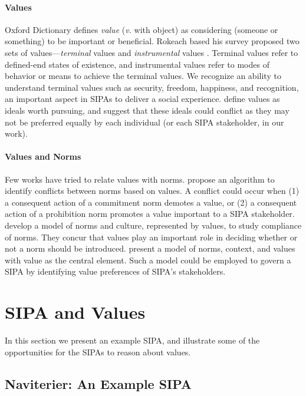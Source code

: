 \documentclass[11pt,          %
               phd,           %
               onehalfspacing %
               ]{ncsuthesis}
\newcommand{\fsl}{\textsl}
\newcommand{\navigationapp}{Naviterier\xspace}
\begin{document}
\paragraph*{Values}
Oxford Dictionary defines \fsl{value} (\emph{v.} with object) as
considering (someone or something) to be important or beneficial.
Rokeach based his survey proposed two sets of values---\fsl{terminal}
values and \fsl{instrumental} values \citep{rokeach1973nature}. Terminal
values refer to defined-end states of existence, and instrumental values
refer to modes of behavior or means to achieve the terminal values. We
recognize an ability to understand terminal values such as security,
freedom, happiness, and recognition, an important aspect in SIPAs to
deliver a social experience. \cite{Dechesne-AIL13-Norms+Values} define
values as ideals worth pursuing, and suggest that these ideals could
conflict as they may not be preferred equally by each individual (or
each SIPA stakeholder, in our work).

\paragraph*{Values and Norms}
Few works have tried to relate values with norms.
\citet{DaSilvaFigueiredo-COIN13} propose an algorithm to identify
conflicts between norms based on values. A conflict could occur when (1)
a consequent action of a commitment norm demotes a value, or (2) a
consequent action of a prohibition norm promotes a value important to a
SIPA stakeholder. \citet{Dechesne-AIL13-Norms+Values} develop a 
model of norms and culture, represented by values, to study compliance of norms.  
They concur that values play an important role in deciding whether or 
not a norm should be introduced. \citet{kayal13coin} present a model 
of norms, context, and values with value as the central element. Such 
a model could be employed to govern a SIPA by identifying value 
preferences of SIPA's stakeholders. 

\section{SIPA and Values}

In this section we present an example SIPA, and illustrate some of the
opportunities for the SIPAs to reason about values.

\subsection*{\navigationapp: An Example SIPA}
\end{document}
